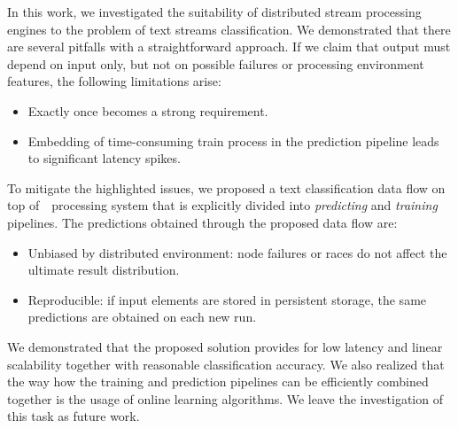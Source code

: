 \label {fs-short-conclusion}

In this work, we investigated the suitability of distributed stream processing engines to the problem of text streams classification. We demonstrated that there are several pitfalls with a straightforward approach. If we claim that output must depend on input only, but not on possible failures or processing environment features, the following limitations arise:

\begin{itemize}
    \item Exactly once becomes a strong requirement.
    \item Embedding of time-consuming train process in the prediction pipeline leads to significant latency spikes.
\end{itemize}

To mitigate the highlighted issues, we proposed a text classification data flow on top of~\FlameStream\ processing system that is explicitly divided into {\em predicting} and {\em training} pipelines. The predictions obtained through the proposed data flow are:

\begin{itemize}
    \item Unbiased by distributed environment: node failures or races do not affect the ultimate result distribution.
    \item Reproducible: if input elements are stored in persistent storage, the same predictions are obtained on each new run.
\end{itemize}

We demonstrated that the proposed solution provides for low latency and linear scalability together with reasonable classification accuracy. We also realized that the way how the training and prediction pipelines can be efficiently combined together is the usage of online learning algorithms. We leave the investigation of this task as future work.